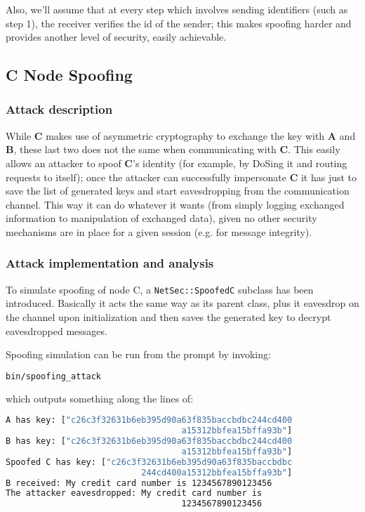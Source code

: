\documentclass[a4paper,12pt,titlepage]{article}
\begin{document}
Also, we'll assume that at every step which involves sending identifiers (such
as step 1), the receiver verifies the id of the sender; this makes spoofing
harder and provides another level of security, easily achievable.

\subsection{C Node Spoofing}
\subsubsection*{Attack description}
While \textbf{C} makes use of asymmetric cryptography to exchange the key with
\textbf{A} and \textbf{B}, these last two does not the same when communicating with
\textbf{C}. This easily allows an attacker to spoof \textbf{C}'s identity (for example,
by DoSing it and routing requests to itself); once the attacker can
successfully impersonate \textbf{C} it has just to save the list of generated keys
and start eavesdropping from the communication channel. This way it can do
whatever it wants (from simply logging exchanged information to manipulation of
exchanged data), given no other security mechanisms are in place for a given
session (e.g. for message integrity).

\subsubsection*{Attack implementation and analysis}
To simulate spoofing of node C, a \texttt{NetSec::SpoofedC} subclass has been
introduced. Basically it acts the same way as its parent class, plus it
eavesdrop on the channel upon initialization and then saves the generated key
to decrypt eavesdropped messages.

Spoofing simulation can be run from the prompt by invoking:

\begin{lstlisting}[language=bash]
bin/spoofing_attack
\end{lstlisting}

which outputs something along the lines of:

\begin{lstlisting}[language=bash]
A has key: ["c26c3f32631b6eb395d90a63f835baccbdbc244cd400
                                   a15312bbfea15bffa93b"]
B has key: ["c26c3f32631b6eb395d90a63f835baccbdbc244cd400
                                   a15312bbfea15bffa93b"]
Spoofed C has key: ["c26c3f32631b6eb395d90a63f835baccbdbc
                           244cd400a15312bbfea15bffa93b"]
B received: My credit card number is 1234567890123456
The attacker eavesdropped: My credit card number is 
                                   1234567890123456
\end{lstlisting}
\end{document}
